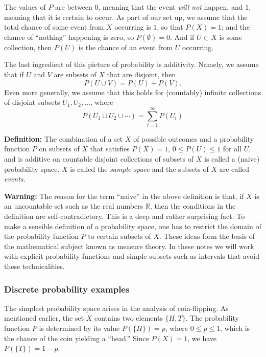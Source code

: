 \documentclass[
]{article}
\begin{document}
The values of \(P\) are between \(0\), meaning that the event \emph{will
not} happen, and \(1\), meaning that it is certain to occur. As part of
our set up, we assume that the total chance of some event from \(X\)
occurring is \(1\), so that \(P(X)=1\); and the chance of ``nothing''
happening is zero, so \(P(\emptyset)=0\). And if \(U\subset X\) is some
collection, then \(P(U)\) is the chance of an event from \(U\)
occurring.

The last ingredient of this picture of probability is additivity.
Namely, we assume that if \(U\) and \(V\) are subsets of \(X\) that are
disjoint, then \[
P(U\cup V)=P(U)+P(V).
\] Even more generally, we assume that this holds for (countably)
infinite collections of disjoint subsets \(U_1,U_2,\ldots\), where \[
P(U_1\cup U_2\cup\cdots)=\sum_{i=1}^{\infty} P(U_i)
\]

\textbf{Definition:} The combination of a set \(X\) of possible outcomes
and a probability function \(P\) on subsets of \(X\) that satisfies
\(P(X)=1\), \(0\le P(U)\le 1\) for all \(U\), and is additive on
countable disjoint collections of subsets of \(X\) is called a (naive)
probability space. \(X\) is called the \emph{sample space} and the
subsets of \(X\) are called \emph{events}.

\textbf{Warning:} The reason for the term ``naive'' in the above
definition is that, if \(X\) is an uncountable set such as the real
numbers \(\mathbb{R}\), then the conditions in the definition are
self-contradictory. This is a deep and rather surprising fact. To make a
sensible definition of a probability space, one has to restrict the
domain of the probability function \(P\) to certain subsets of \(X\).
These ideas form the basis of the mathematical subject known as measure
theory. In these notes we will work with explicit probability functions
and simple subsets such as intervals that avoid these technicalities.

\hypertarget{discrete-probability-examples}{%
\subsubsection{Discrete probability
examples}\label{discrete-probability-examples}}

The simplest probability space arises in the analysis of coin-flipping.
As mentioned earlier, the set \(X\) contains two elements \(\{H,T\}\).
The probability function \(P\) is determined by its value
\(P(\{H\})=p\), where \(0\le p\le 1\), which is the chance of the coin
yielding a ``head.'' Since \(P(X)=1\), we have \(P(\{T\})=1-p\).
\end{document}
